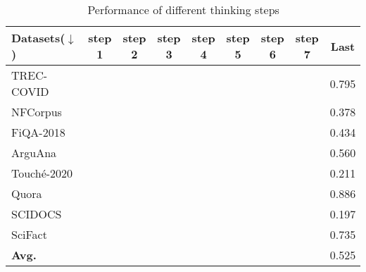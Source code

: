 \begin{table*}[ht]
    \centering
    \small
    \label{tab:thing_step}
    \begin{tabular}{l|c|c|c|c|c|c|c|c}
        \hline
        \textbf{Datasets($\downarrow$)} & \textbf{step 1} & \textbf{step 2} & \textbf{step 3} & \textbf{step 4} & \textbf{step 5}&\textbf{step 6}&\textbf{step 7}&\textbf{Last} \\
        \hline
        {TREC-COVID} & &  &  &  & & & &0.795  \\
        {NFCorpus} & &  &  &  & & & &0.378  \\
        {FiQA-2018} & &  &  &  & & & &0.434  \\
        {ArguAna} & &  &  &  & & & &0.560  \\
        {Touché-2020} & &  &  &  & & & &0.211 \\
        {Quora} & &  &  &  & & & &0.886  \\
        {SCIDOCS} & &  &  &  & & & &0.197  \\
        {SciFact} & &  &  &  & & & &0.735  \\
        \hline
        {\textbf{Avg.}}  & &  &  &  & & & &0.525  \\
        \hline
    \end{tabular}
    \caption{Performance of different thinking steps}
    \footnotesize
\end{table*}